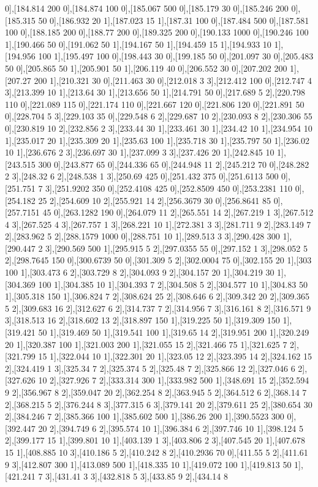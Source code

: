 {0],[184.814 200 0],[184.874 100 0],[185.067 500 0],[185.179 30 0],[185.246 200 0],[185.315 50 0],[186.932 20 1],[187.023 15 1],[187.31 100 0],[187.484 500 0],[187.581 100 0],[188.185 200 0],[188.77 200 0],[189.325 200 0],[190.133 1000 0],[190.246 100 1],[190.466 50 0],[191.062 50 1],[194.167 50 1],[194.459 15 1],[194.933 10 1],[194.956 100 1],[195.497 100 0],[198.443 30 0],[199.185 50 0],[201.097 30 0],[205.483 50 0],[205.865 50 1],[205.901 50 1],[206.119 40 0],[206.552 30 0],[207.202 200 1],[207.27 200 1],[210.321 30 0],[211.463 30 0],[212.018 3 3],[212.412 100 0],[212.747 4 3],[213.399 10 1],[213.64 30 1],[213.656 50 1],[214.791 50 0],[217.689 5 2],[220.798 110 0],[221.089 115 0],[221.174 110 0],[221.667 120 0],[221.806 120 0],[221.891 50 0],[228.704 5 3],[229.103 35 0],[229.548 6 2],[229.687 10 2],[230.093 8 2],[230.306 55 0],[230.819 10 2],[232.856 2 3],[233.44 30 1],[233.461 30 1],[234.42 10 1],[234.954 10 1],[235.017 20 1],[235.309 20 1],[235.63 100 1],[235.718 30 1],[235.797 50 1],[236.02 10 1],[236.676 2 3],[236.697 30 1],[237.099 3 3],[237.426 20 1],[242.845 10 1],[243.515 300 0],[243.877 65 0],[244.336 65 0],[244.948 11 2],[245.212 70 0],[248.282 2 3],[248.32 6 2],[248.538 1 3],[250.69 425 0],[251.432 375 0],[251.6113 500 0],[251.751 7 3],[251.9202 350 0],[252.4108 425 0],[252.8509 450 0],[253.2381 110 0],[254.182 25 2],[254.609 10 2],[255.921 14 2],[256.3679 30 0],[256.8641 85 0],[257.7151 45 0],[263.1282 190 0],[264.079 11 2],[265.551 14 2],[267.219 1 3],[267.512 4 3],[267.525 4 3],[267.757 1 3],[268.221 10 1],[272.381 3 3],[281.711 9 2],[283.149 7 2],[283.962 5 2],[288.1579 1000 0],[288.751 10 1],[289.513 3 3],[290.428 300 1],[290.447 2 3],[290.569 500 1],[295.915 5 2],[297.0355 55 0],[297.152 1 3],[298.052 5 2],[298.7645 150 0],[300.6739 50 0],[301.309 5 2],[302.0004 75 0],[302.155 20 1],[303 100 1],[303.473 6 2],[303.729 8 2],[304.093 9 2],[304.157 20 1],[304.219 30 1],[304.369 100 1],[304.385 10 1],[304.393 7 2],[304.508 5 2],[304.577 10 1],[304.83 50 1],[305.318 150 1],[306.824 7 2],[308.624 25 2],[308.646 6 2],[309.342 20 2],[309.365 5 2],[309.683 16 2],[312.627 6 2],[314.737 7 2],[314.956 7 3],[316.161 8 2],[316.571 9 3],[318.513 16 2],[318.602 13 2],[318.897 150 1],[319.225 50 1],[319.309 150 1],[319.421 50 1],[319.469 50 1],[319.541 100 1],[319.65 14 2],[319.951 200 1],[320.249 20 1],[320.387 100 1],[321.003 200 1],[321.055 15 2],[321.466 75 1],[321.625 7 2],[321.799 15 1],[322.044 10 1],[322.301 20 1],[323.05 12 2],[323.395 14 2],[324.162 15 2],[324.419 1 3],[325.34 7 2],[325.374 5 2],[325.48 7 2],[325.866 12 2],[327.046 6 2],[327.626 10 2],[327.926 7 2],[333.314 300 1],[333.982 500 1],[348.691 15 2],[352.594 9 2],[356.967 8 2],[359.047 20 2],[362.254 8 2],[363.945 5 2],[364.512 6 2],[368.14 7 2],[368.215 5 2],[376.244 8 3],[377.315 6 3],[379.141 20 2],[379.611 25 2],[380.654 30 2],[384.246 7 2],[385.366 100 1],[385.602 500 1],[386.26 200 1],[390.5523 300 0],[392.447 20 2],[394.749 6 2],[395.574 10 1],[396.384 6 2],[397.746 10 1],[398.124 5 2],[399.177 15 1],[399.801 10 1],[403.139 1 3],[403.806 2 3],[407.545 20 1],[407.678 15 1],[408.885 10 3],[410.186 5 2],[410.242 8 2],[410.2936 70 0],[411.55 5 2],[411.61 9 3],[412.807 300 1],[413.089 500 1],[418.335 10 1],[419.072 100 1],[419.813 50 1],[421.241 7 3],[431.41 3 3],[432.818 5 3],[433.85 9 2],[434.14 8 }
